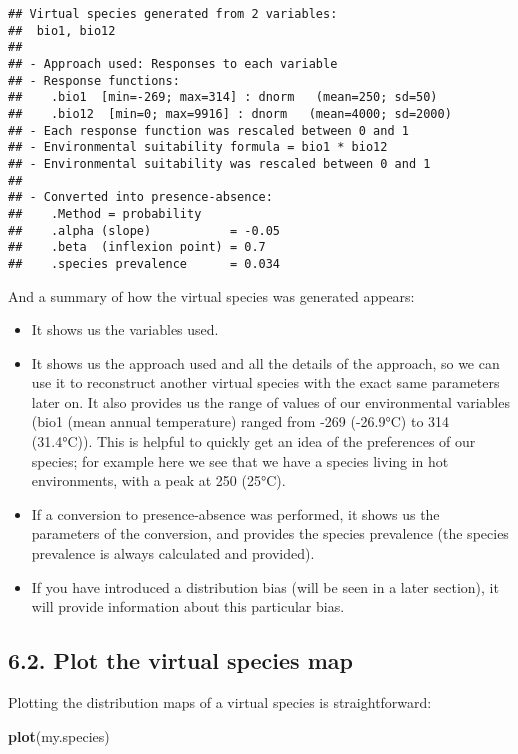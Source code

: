 \documentclass[]{article}
\newenvironment{Shaded}{\begin{snugshade}}{\end{snugshade}}
\newcommand{\KeywordTok}[1]{\textcolor[rgb]{0.13,0.29,0.53}{\textbf{#1}}}
\newcommand{\NormalTok}[1]{#1}
\providecommand{\tightlist}{%
  \setlength{\itemsep}{0pt}\setlength{\parskip}{0pt}}
\begin{document}
\begin{verbatim}
## Virtual species generated from 2 variables:
##  bio1, bio12
## 
## - Approach used: Responses to each variable
## - Response functions:
##    .bio1  [min=-269; max=314] : dnorm   (mean=250; sd=50)
##    .bio12  [min=0; max=9916] : dnorm   (mean=4000; sd=2000)
## - Each response function was rescaled between 0 and 1
## - Environmental suitability formula = bio1 * bio12
## - Environmental suitability was rescaled between 0 and 1
## 
## - Converted into presence-absence:
##    .Method = probability
##    .alpha (slope)           = -0.05
##    .beta  (inflexion point) = 0.7
##    .species prevalence      = 0.034
\end{verbatim}

And a summary of how the virtual species was generated appears:

\begin{itemize}
\tightlist
\item
  It shows us the variables used.
\item
  It shows us the approach used and all the details of the approach, so
  we can use it to reconstruct another virtual species with the exact
  same parameters later on. It also provides us the range of values of
  our environmental variables (bio1 (mean annual temperature) ranged
  from -269 (-26.9°C) to 314 (31.4°C)). This is helpful to quickly get
  an idea of the preferences of our species; for example here we see
  that we have a species living in hot environments, with a peak at 250
  (25°C).
\item
  If a conversion to presence-absence was performed, it shows us the
  parameters of the conversion, and provides the species prevalence (the
  species prevalence is always calculated and provided).
\item
  If you have introduced a distribution bias (will be seen in a later
  section), it will provide information about this particular bias.
\end{itemize}

\subsection{6.2. Plot the virtual species
map}\label{plot-the-virtual-species-map}

Plotting the distribution maps of a virtual species is straightforward:

\begin{Shaded}
\begin{Highlighting}[]
\KeywordTok{plot}\NormalTok{(my.species)}
\end{Highlighting}
\end{Shaded}
\end{document}
